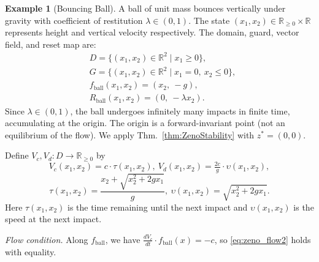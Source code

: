 \documentclass[letterpaper, 10 pt, conference]{IEEEconf}
\theoremstyle{definition}
\newtheorem{example}[thm]{Example}
\newcommand{\maps}{\colon}
\newcommand{\R}{\mathbb R}
\begin{document}
\begin{example}[Bouncing Ball]
\label{ex:bouncingball}
    A ball of unit mass bounces vertically under gravity with coefficient of restitution $\lambda \in (0,1)$. The state $(x_1, x_2) \in \R_{\geq 0} \times \R$ represents height and vertical velocity respectively. The domain, guard, vector field, and reset map are:
    \begin{align*}
        &D = \{(x_1, x_2) \in \R^2 \mid x_1 \geq 0\}, \\
        &G = \{(x_1, x_2) \in \R^2 \mid x_1 = 0,\ x_2 \leq 0\}, \\
        &f_{\mathrm{ball}}(x_1, x_2) = (x_2,\ -g), \\
        &R_{\mathrm{ball}}(x_1, x_2) = (0,\ -\lambda x_2).
    \end{align*}
    Since $\lambda \in (0,1)$, the ball undergoes infinitely many impacts in finite time, accumulating at the origin. The origin is a forward-invariant point (not an equilibrium of the flow). We apply Thm.~\ref{thm:ZenoStability} with $z^* = (0,0)$.

    Define $V_c, V_d \maps D \to \R_{\geq 0}$ by
    \begin{equation*}
        V_c(x_1, x_2) = c \cdot \tau(x_1, x_2), \ 
        V_d(x_1, x_2) = \tfrac{2c}{g} \cdot \upsilon(x_1, x_2),
    \end{equation*}
    \begin{equation*}
        \tau(x_1, x_2) = \frac{x_2 + \sqrt{x_2^2 + 2gx_1}}{g}, \ \upsilon(x_1, x_2) = \sqrt{x_2^2 + 2gx_1}.
    \end{equation*}
    Here $\tau(x_1, x_2)$ is the time remaining until the next impact and $\upsilon(x_1, x_2)$ is the speed at the next impact. 

    \textit{Flow condition.} Along $f_{\mathrm{ball}}$, we have $\frac{dV_c}{dt} \cdot f_{\mathrm{ball}}(x) = -c$, so \eqref{eq:zeno_flow2} holds with equality.
    

\end{example}
\end{document}
